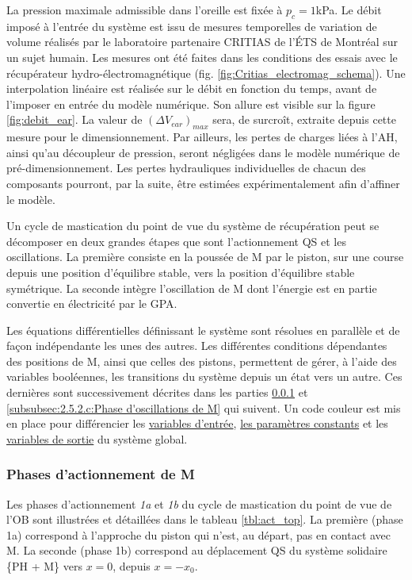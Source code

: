 La pression maximale admissible dans l'oreille est fixée à \mbox{$p_c=1$kPa}. Le débit imposé à l'entrée du système est issu de mesures temporelles de variation de volume réalisés par le laboratoire partenaire CRITIAS de l'ÉTS de Montréal sur un sujet humain. Les mesures ont été faites dans les conditions des essais avec le récupérateur hydro-électromagnétique (fig. \ref{fig:Critias_electromag_schema}). Une interpolation linéaire est réalisée sur le débit en fonction du temps, avant  de l'imposer en entrée du modèle numérique. Son allure est visible sur la figure \ref{fig:debit_ear}. La valeur de $(\Delta V_{ear})_{max}$ sera, de surcroît, extraite depuis cette mesure pour le dimensionnement. Par ailleurs, les pertes de charges liées à l'AH, ainsi qu'au découpleur de pression, seront négligées dans le modèle numérique de pré-dimensionnement. Les pertes hydrauliques individuelles de chacun des composants pourront, par la suite, être estimées expérimentalement afin d'affiner le modèle.

Un cycle de mastication du point de vue du système de récupération peut se décomposer en deux grandes étapes que sont l'actionnement QS et les oscillations. La première consiste en la poussée de M par le piston, sur une course depuis une position d'équilibre stable, vers la position d'équilibre stable symétrique. La seconde intègre l'oscillation de M dont l'énergie est en partie convertie en électricité par le GPA. 

Les équations différentielles définissant le système sont résolues en parallèle et de façon indépendante les unes des autres. Les différentes conditions dépendantes des positions de M, ainsi que celles des pistons, permettent de gérer, à l'aide des variables booléennes, les transitions du système depuis un état vers un autre. Ces dernières sont successivement décrites dans les parties \ref{subsubsec:2.5.2.c:Phase d'actionnement de M} et \ref{subsubsec:2.5.2.c:Phase d'oscillations de M} qui suivent. Un code couleur est mis en place pour différencier les \textcolor{c}{\underline{variables d'entrée}}, \textcolor{b}{\underline{les paramètres constants}} et les \textcolor{a}{\underline{variables de sortie}} du système global.
	\subsubsection{Phases d'actionnement de M}
	\label{subsubsec:2.5.2.c:Phase d'actionnement de M}
Les phases d'actionnement \emph{1a} et \emph{1b} du cycle de mastication du point de vue de l'OB sont illustrées et détaillées dans le tableau \ref{tbl:act_top}. La première (phase 1a) correspond à l'approche du piston qui n'est, au départ, pas en contact avec M. La seconde (phase 1b) correspond au déplacement QS du système solidaire \{PH + M\} vers $x=0$, depuis $x=-x_0$.\\
